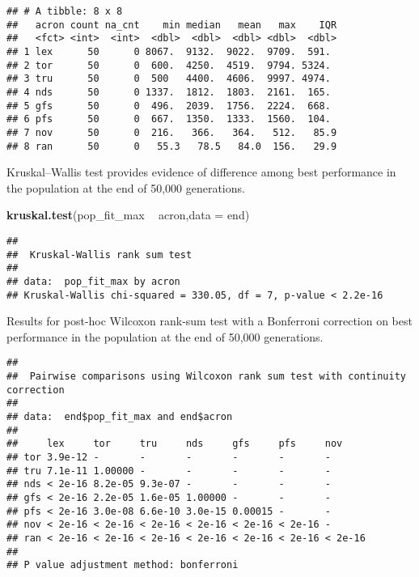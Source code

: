 \documentclass[]{book}
\newenvironment{Shaded}{\begin{snugshade}}{\end{snugshade}}
\newcommand{\DataTypeTok}[1]{\textcolor[rgb]{0.13,0.29,0.53}{#1}}
\newcommand{\KeywordTok}[1]{\textcolor[rgb]{0.13,0.29,0.53}{\textbf{#1}}}
\newcommand{\NormalTok}[1]{#1}
\newcommand{\OperatorTok}[1]{\textcolor[rgb]{0.81,0.36,0.00}{\textbf{#1}}}
\newcommand{\OtherTok}[1]{\textcolor[rgb]{0.56,0.35,0.01}{#1}}
\newcommand{\StringTok}[1]{\textcolor[rgb]{0.31,0.60,0.02}{#1}}
\begin{document}
\begin{verbatim}
## # A tibble: 8 x 8
##   acron count na_cnt    min median   mean   max    IQR
##   <fct> <int>  <int>  <dbl>  <dbl>  <dbl> <dbl>  <dbl>
## 1 lex      50      0 8067.  9132.  9022.  9709.  591. 
## 2 tor      50      0  600.  4250.  4519.  9794. 5324. 
## 3 tru      50      0  500   4400.  4606.  9997. 4974. 
## 4 nds      50      0 1337.  1812.  1803.  2161.  165. 
## 5 gfs      50      0  496.  2039.  1756.  2224.  668. 
## 6 pfs      50      0  667.  1350.  1333.  1560.  104. 
## 7 nov      50      0  216.   366.   364.   512.   85.9
## 8 ran      50      0   55.3   78.5   84.0  156.   29.9
\end{verbatim}

Kruskal--Wallis test provides evidence of difference among best performance in the population at the end of 50,000 generations.

\begin{Shaded}
\begin{Highlighting}[]
\KeywordTok{kruskal.test}\NormalTok{(pop_fit_max }\OperatorTok{~}\StringTok{ }\NormalTok{acron,}\DataTypeTok{data =}\NormalTok{ end)}
\end{Highlighting}
\end{Shaded}

\begin{verbatim}
## 
##  Kruskal-Wallis rank sum test
## 
## data:  pop_fit_max by acron
## Kruskal-Wallis chi-squared = 330.05, df = 7, p-value < 2.2e-16
\end{verbatim}

Results for post-hoc Wilcoxon rank-sum test with a Bonferroni correction on best performance in the population at the end of 50,000 generations.

\begin{Shaded}
\end{Shaded}

\begin{verbatim}
## 
##  Pairwise comparisons using Wilcoxon rank sum test with continuity correction 
## 
## data:  end$pop_fit_max and end$acron 
## 
##     lex     tor     tru     nds     gfs     pfs     nov    
## tor 3.9e-12 -       -       -       -       -       -      
## tru 7.1e-11 1.00000 -       -       -       -       -      
## nds < 2e-16 8.2e-05 9.3e-07 -       -       -       -      
## gfs < 2e-16 2.2e-05 1.6e-05 1.00000 -       -       -      
## pfs < 2e-16 3.0e-08 6.6e-10 3.0e-15 0.00015 -       -      
## nov < 2e-16 < 2e-16 < 2e-16 < 2e-16 < 2e-16 < 2e-16 -      
## ran < 2e-16 < 2e-16 < 2e-16 < 2e-16 < 2e-16 < 2e-16 < 2e-16
## 
## P value adjustment method: bonferroni
\end{verbatim}
\end{document}
